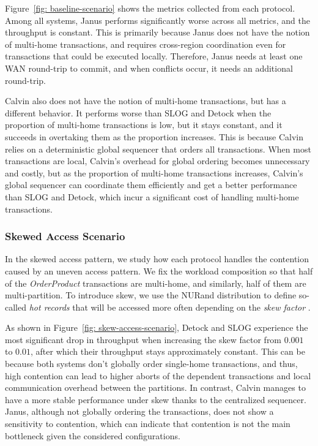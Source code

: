 Figure~\ref{fig: baseline-scenario} shows the metrics collected from each protocol. Among all systems, Janus performs significantly worse across all metrics, and the throughput is constant. This is primarily because Janus does not have the notion of multi-home transactions, and requires cross-region coordination even for transactions that could be executed locally. Therefore, Janus needs at least one WAN round-trip to commit, and when conflicts occur, it needs an additional round-trip.

Calvin also does not have the notion of multi-home transactions, but has a different behavior. It performs worse than SLOG and Detock when the proportion of multi-home transactions is low, but it stays constant, and it succeeds in overtaking them as the proportion increases. This is because Calvin relies on a deterministic global sequencer that orders all transactions. When most transactions are local, Calvin's overhead for global ordering becomes unnecessary and costly, but as the proportion of multi-home transactions increases, Calvin's global sequencer can coordinate them efficiently and get a better performance than SLOG and Detock, which incur a significant cost of handling multi-home transactions.  

\subsubsection{Skewed Access Scenario}
In the skewed access pattern, we study how each protocol handles the contention caused by an uneven access pattern. We fix the workload composition so that half of the \textit{OrderProduct} transactions are multi-home, and similarly, half of them are multi-partition. To introduce skew, we use the NURand distribution to define so-called \textit{hot records} that will be accessed more often depending on the \textit{skew factor} \cite{council2010tpc}.

As shown in Figure~\ref{fig: skew-access-scenario}, Detock and SLOG experience the most significant drop in throughput when increasing the skew factor from $0.001$ to $0.01$, after which their throughput stays approximately constant. This can be because both systems don't globally order single-home transactions, and thus, high contention can lead to higher aborts of the dependent transactions and local communication overhead between the partitions. In contrast, Calvin manages to have a more stable performance under skew thanks to the centralized sequencer. Janus, although not globally ordering the transactions, does not show a sensitivity to contention, which can indicate that contention is not the main bottleneck given the considered configurations. 

